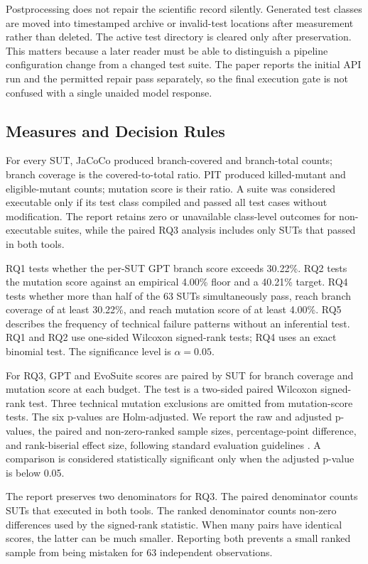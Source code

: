 Postprocessing does not repair the scientific record silently. Generated test classes are moved into timestamped archive or invalid-test locations after measurement rather than deleted. The active test directory is cleared only after preservation. This matters because a later reader must be able to distinguish a pipeline configuration change from a changed test suite. The paper reports the initial API run and the permitted repair pass separately, so the final execution gate is not confused with a single unaided model response.

\subsection{Measures and Decision Rules}
For every SUT, JaCoCo \cite{Lu_2026} produced branch-covered and branch-total counts; branch coverage is the covered-to-total ratio. PIT \cite{Bouafif_2025} produced killed-mutant and eligible-mutant counts; mutation score is their ratio. A suite was considered executable only if its test class compiled and passed all test cases without modification. The report retains zero or unavailable class-level outcomes for non-executable suites, while the paired RQ3 analysis includes only SUTs that passed in both tools.

RQ1 tests whether the per-SUT GPT branch score exceeds 30.22\%. RQ2 tests the mutation score against an empirical 4.00\% floor and a 40.21\% target. RQ4 tests whether more than half of the 63 SUTs simultaneously pass, reach branch coverage of at least 30.22\%, and reach mutation score of at least 4.00\%. RQ5 describes the frequency of technical failure patterns without an inferential test. RQ1 and RQ2 use one-sided Wilcoxon signed-rank tests; RQ4 uses an exact binomial test. The significance level is $\alpha=0.05$.

For RQ3, GPT and EvoSuite scores are paired by SUT for branch coverage and mutation score at each budget. The test is a two-sided paired Wilcoxon signed-rank test. Three technical mutation exclusions are omitted from mutation-score tests. The six p-values are Holm-adjusted. We report the raw and adjusted p-values, the paired and non-zero-ranked sample sizes, percentage-point difference, and rank-biserial effect size, following standard evaluation guidelines \cite{evaluating2024}. A comparison is considered statistically significant only when the adjusted p-value is below 0.05.

The report preserves two denominators for RQ3. The paired denominator counts SUTs that executed in both tools. The ranked denominator counts non-zero differences used by the signed-rank statistic. When many pairs have identical scores, the latter can be much smaller. Reporting both prevents a small ranked sample from being mistaken for 63 independent observations.

